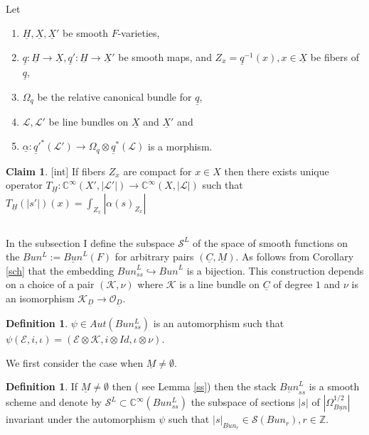 \documentclass[11pt,a4paper,twoside]{amsart}
\theoremstyle{definition}
\newtheorem{definition}[theorem]{Definition}
\newtheorem{claim}[theorem]{Claim}
\newcommand{\mC}{\mathbb C}
\newcommand{\mZ}{\mathbb Z}
\newcommand{\mcE}{\mathcal E}
\newcommand{\mcK}{\mathcal K}
\newcommand{\mcL}{\mathcal L}
\newcommand{\mcO}{\mathcal O}
\newcommand{\mcS}{\mathcal S}
\newcommand{\bO}{\Omega}
\newcommand{\un}{\underline}
\newcommand{\ho}{\hookrightarrow}
\newcommand{\emp}{\emptyset}
\begin{document}
\subsection{}Let \begin{enumerate} 
\item
$\un H, \un X ,\un X' $ be smooth $F$-varieties,
\item  $\un q: \un H \to \un X, \un q ': \un H \to \un X' $ be smooth maps, and $Z _x = \un q^{-1}(x), x\in \un X $ be fibers of $\un q$,
\item $\bO _q $ be  the relative canonical bundle for $\un q$,
\item   $\mcL ,\mcL '$ be line bundles on $ \un X $ and $\un X' $ and 
\item $\un \alpha : {\un q'}^\ast (\mcL ')\to \bO _q\otimes {\un q}^\ast (\mcL ) $ is a morphism.

\end{enumerate} 

\begin{claim}\label{int}[int] If fibers $Z_x$ are compact for $x\in X$ then there exists unique operator $T_{\un H}:  \mC ^\infty (X', |\mcL '|) \to  \mC ^\infty (X, |\mcL|) $ such that 
$T_{\un H} (|s'|) (x) = \int _{Z_x} |\alpha (s)_{Z_x}|$
\end{claim}




\subsection{} 

In the subsection I define the subspace $\mcS ^L$ of the space of smooth functions on the $Bun ^L:= \un {Bun}^L(F)$ for  arbitrary pairs $(\un C,\un M)$.   As follows from Corollary \ref{sch} that the embedding $  {Bun}_{ss}^L \ho  {Bun}^L $ is a bijection. This construction depends on a choice of a pair $(\mcK ,\nu)$ where $\mcK$ is a line bundle on $\un C$ of degree $1$ and $\nu $ is an isomorphism $\mcK _{\un D}\to \mcO _{\un D}$. 

 \begin{definition} $\psi \in Aut ( Bun_{ss}^L)$ is an automorphism such that $\psi   (\mcE ,i,\iota) = (\mcE \otimes \mcK,i\otimes Id,\iota \otimes \nu) $.
\end{definition}



We first consider the case when $\un M \neq \emp$.
 

\begin{definition} If $\un M \neq \emp$ then ( see Lemma \ref{ss}) then  the stack $\un {Bun}_{ss}^L $ is  a smooth scheme and denote by  $\mcS ^L\subset \mC ^\infty (Bun_{ss}^L) $ the subspace of sections $|s|$ of $|\bO ^{1/2}_{\un {Bun}}|$ invariant under the automorphism $\psi$ such that $|s|_{Bun _r}\in \mcS (Bun _r), r\in \mZ$. \end{definition}
 
\end{document}
